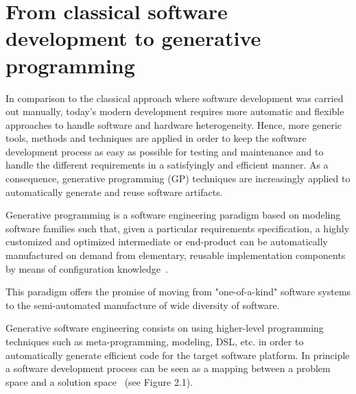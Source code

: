 



\section{From classical software development to generative programming}
\label{sec:FROM} 
In comparison to the classical approach where software development was carried out manually, today’s modern development requires more automatic and flexible approaches to handle software and hardware heterogeneity.
Hence, more generic tools, methods and techniques are applied in order to keep the software development process as easy as possible for testing and maintenance and to handle the different requirements in a satisfyingly and efficient manner.
As a consequence, generative programming (GP) techniques are increasingly applied to automatically generate and reuse software artifacts.
\begin{mydef}
		Generative programming is a software engineering paradigm based on modeling software families such that, given a particular requirements specification, a highly customized and optimized intermediate or end-product can be automatically manufactured on demand from elementary, reusable implementation components by means of configuration knowledge~\cite{Czarnecki:2000:GPM:345203}.
\end{mydef}

This paradigm offers the promise of moving from "one-of-a-kind" software systems to the semi-automated manufacture of wide diversity of software.

Generative software engineering consists on using higher-level programming techniques such as meta-programming, modeling, DSL, etc. in order to automatically generate efficient code for the target software platform. 
In principle a software development process can be seen as a mapping between a problem space and a solution space~\cite{czarnecki2005overview} (see Figure 2.1). 

